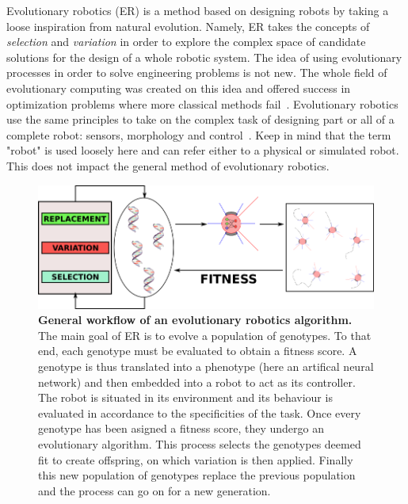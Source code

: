     Evolutionary robotics (ER) is a method based on designing robots by taking a loose inspiration from natural evolution. Namely, ER takes the concepts of \emph{selection} and \emph{variation} in order to explore the complex space of candidate solutions for the design of a whole robotic system. The idea of using evolutionary processes in order to solve engineering problems is not new. The whole field of evolutionary computing was created on this idea and offered success in optimization problems where more classical methods fail~\parencite{Holland1975, Goldberg1989, Eiben2015}. Evolutionary robotics use the same principles to take on the complex task of designing part or all of a complete robot: sensors, morphology and control~\parencite{Nolfi2000, Floreano2008, Doncieux2015a}. Keep in mind that the term "robot" is used loosely here and can refer either to a physical or simulated robot. This does not impact the general method of evolutionary robotics.


    \begin{figure}[hbt]
        \begin{center}
          \includegraphics[scale = 0.50]{fig/Intro/EvolutionaryRobotics.png}
          \caption{\textbf{General workflow of an evolutionary robotics algorithm.}
          The main goal of ER is to evolve a population of genotypes. To that end, each genotype must be evaluated to obtain a fitness score. A genotype is thus translated into a phenotype (here an artifical neural network) and then embedded into a robot to act as its controller. The robot is situated in its environment and its behaviour is evaluated in accordance to the specificities of the task. Once every genotype has been asigned a fitness score, they undergo an evolutionary algorithm. This process selects the genotypes deemed fit to create offspring, on which variation is then applied. Finally this new population of genotypes replace the previous population and the process can go on for a new generation.} 
          \label{fig:EvolutionaryRobotics}
        \end{center}
    \end{figure}

